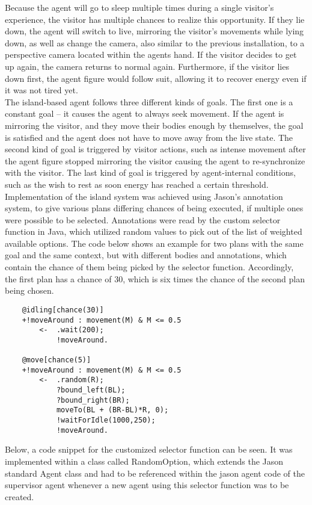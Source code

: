 \documentclass[draft,final]{vutinfth} %
\begin{document}
Because the agent will go to sleep multiple times during a single \gls{visitor}’s experience, the \gls{visitor} has multiple chances to realize this opportunity. 
If they lie down, the agent will switch to \gls{live}, mirroring the \gls{visitor}'s movements while lying down, as well as change the camera, also similar to the previous installation, to a perspective camera located within the agents hand. 
If the \gls{visitor} decides to get up again, the camera returns to normal again. 
Furthermore, if the \gls{visitor} lies down first, the \gls{agent figure} would follow suit, allowing it to recover energy even if it was not tired yet.\\
The island-based agent follows three different kinds of goals. 
The first one is a constant goal – it causes the agent to always seek movement. 
If the agent is mirroring the \gls{visitor}, and they move their bodies enough by themselves, the goal is satisfied and the agent does not have to move away from the \gls{live} state. 
The second kind of goal is triggered by \gls{visitor} actions, such as intense movement after the \gls{agent figure} stopped mirroring the \gls{visitor} causing the agent to re-synchronize with the \gls{visitor}. 
The last kind of goal is triggered by agent-internal conditions, such as the wish to rest as soon energy has reached a certain threshold. \\
Implementation of the \gls{island system} was achieved using Jason’s annotation system, to give various plans differing chances of being executed, if multiple ones were possible to be selected.
Annotations were read by the custom selector function in Java, which utilized random values to pick out of the list of weighted available options. 
The code below shows an example for two plans with the same goal and the same context, but with different bodies and annotations, which contain the chance of them being picked by the selector function. 
Accordingly, the first plan has a chance of 30, which is six times the chance of the second plan being chosen.
\begin{verbatim}
    @idling[chance(30)]	
    +!moveAround : movement(M) & M <= 0.5
        <-  .wait(200);	
            !moveAround.

    @move[chance(5)]
    +!moveAround : movement(M) & M <= 0.5
        <-  .random(R);	
            ?bound_left(BL);
            ?bound_right(BR);
            moveTo(BL + (BR-BL)*R, 0);
            !waitForIdle(1000,250);	
            !moveAround.
\end{verbatim}
Below, a code snippet for the customized selector function can be seen. It was implemented within a class called RandomOption, which extends the Jason standard Agent class and had to be referenced within the \gls{jason agent} code of the supervisor agent whenever a new agent using this selector function was to be created. 
\end{document}
